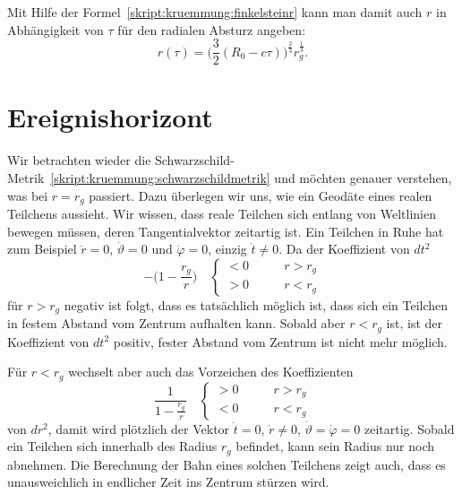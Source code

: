 Mit Hilfe der Formel~\eqref{skript:kruemmung:finkelsteinr}
kann man damit auch $r$ in Abhängigkeit von $\tau$ für den radialen Absturz
angeben:
\[
r(\tau)=\biggl(\frac32(R_0-c\tau)\biggr)^{\frac23}r_g^{\frac13}.
\]

\section{Ereignishorizont%
\label{skript:section:ereignishorizont}}
Wir betrachten wieder die
Schwarzschild-Metrik~\eqref{skript:kruemmung:schwarzschildmetrik}
und möchten genauer verstehen, was bei $r=r_g$ passiert.
Dazu überlegen wir uns, wie ein Geodäte eines realen Teilchens 
aussieht.
Wir wissen, dass reale Teilchen sich entlang von Weltlinien bewegen müssen,
deren Tangentialvektor zeitartig ist.
Ein Teilchen in Ruhe hat zum Beispiel $\dot r=0$, $\dot \vartheta=0$ und
$\dot\varphi=0$, einzig $\dot t\ne 0$.
Da der Koeffizient von $dt^2$
\[
-\biggl(1-\frac{r_g}{r}\biggr)
\quad
\begin{cases}
<0&\qquad r > r_g
\\
>0&\qquad r < r_g
\end{cases}
\]
für $r>r_g$
negativ ist folgt, dass es tatsächlich möglich ist, dass sich ein Teilchen
in festem Abstand vom Zentrum aufhalten kann.
Sobald aber $r<r_g$ ist, ist der Koeffizient von $dt^2$ positiv,
fester Abstand vom Zentrum ist nicht mehr möglich.

Für $r<r_g$ wechselt aber auch das Vorzeichen des Koeffizienten
\[
\frac1{\displaystyle1-\frac{r_g}{r}}
\quad
\begin{cases}
>0&\qquad r>r_g
\\
<0&\qquad r<r_g
\end{cases}
\]
von $dr^2$, damit wird plötzlich der Vektor $\dot t=0$, $\dot r\ne 0$,
$\dot\vartheta=\dot\varphi=0$ zeitartig.
Sobald ein Teilchen sich innerhalb des Radius $r_g$ befindet, kann
sein Radius nur noch abnehmen.
Die Berechnung der Bahn eines solchen Teilchens zeigt auch, dass
es unausweichlich in endlicher Zeit ins Zentrum stürzen wird.

